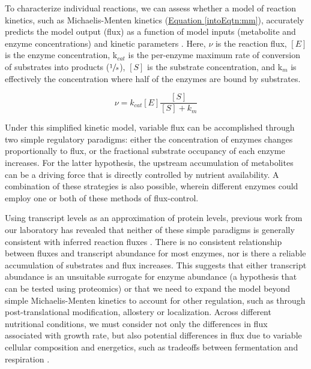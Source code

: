 To characterize individual reactions, we can assess whether a model of reaction kinetics, such as Michaelis-Menten kinetics (\hyperref[intoEqtn:mm]{Equation \ref{intoEqtn:mm}}), accurately predicts the model output (flux) as a function of model inputs (metabolite and enzyme concentrations) and kinetic parameters \cite{Anonymous:1913wn, Liebermeister:2006fm, Tummler:2014cp}. Here, $\nu$ is the reaction flux, $\left[E\right]$ is the enzyme concentration, k$_{cat}$ is the per-enzyme maximum rate of conversion of substrates into products ($\sfrac{1}{s}$), $\left[S\right]$ is the substrate concentration, and k$_{m}$ is effectively the concentration where half of the enzymes are bound by substrates.

\begin{equation}
\nu = k_{cat}\left[E\right]\frac{\left[S\right]}{\left[S\right] + k_{m}}\label{intoEqtn:mm}
\end{equation}

Under this simplified kinetic model, variable flux can be accomplished through two simple regulatory paradigms: either the concentration of enzymes changes proportionally to flux, or the fractional substrate occupancy of each enzyme increases. For the latter hypothesis, the upstream accumulation of metabolites can be a driving force that is directly controlled by nutrient availability. A combination of these strategies is also possible, wherein different enzymes could employ one or both of these methods of flux-control. 

Using transcript levels as an approximation of protein levels, previous work from our laboratory has revealed that neither of these simple paradigms is generally consistent with inferred reaction fluxes \cite{Bradley:2009fj}. There is no consistent relationship between fluxes and transcript abundance for most enzymes, nor is there a reliable accumulation of substrates and flux increases. This suggests that either transcript abundance is an unsuitable surrogate for enzyme abundance (a hypothesis that can be tested using proteomics) or that we need to expand the model beyond simple Michaelis-Menten kinetics to account for other regulation, such as through post-translational modification, allostery or localization. Across different nutritional conditions, we must consider not only the differences in flux associated with growth rate, but also potential differences in flux due to variable cellular composition and energetics, such as tradeoffs between fermentation and respiration \cite{Lange:2001th, Feist:2010hq, BARFORD:1979ei}.

